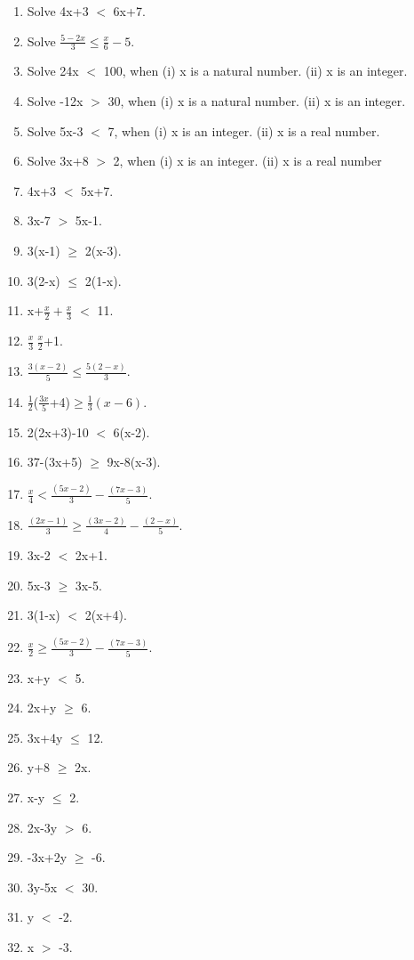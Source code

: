 \begin{enumerate}[label=\arabic*.,ref=\thesubsection.\theenumi]
    \item Solve 4x+3 $<$ 6x+7.
    \item Solve $\frac{5-2x}{3} \leq \frac{x}{6}-5$.

	\item Solve 24x $<$ 100, when
	(i) x is a natural number.
	(ii) x is an integer.
	\item Solve -12x $>$ 30, when
	(i) x is a natural number.
	(ii) x is an integer.
	\item Solve 5x-3 $<$ 7, when
	(i) x is an integer.
	(ii) x is a real number.
	\item Solve 3x+8 $>$ 2, when
	(i) x is an integer.
	(ii) x is a real number
	
	\item 4x+3 $<$ 5x+7.
	\item 3x-7 $>$ 5x-1.
	\item 3(x-1) $\geq$ 2(x-3).
	\item 3(2-x) $\leq$ 2(1-x).
	\item x+$\frac{x}{2}+\frac{x}{3}$ $<$ 11.
	\item $\frac{x}{3}\>\frac{x}{2}$+1.
	\item $\frac{3(x-2)}{5}\leq\frac{5(2-x)}{3}$.
	\item $ \frac{1}{2}$($\frac{3x}{5}$+4)$\geq\frac{1}{3}(x-6)$.
	\item 2(2x+3)-10 $<$ 6(x-2).
	\item 37-(3x+5) $\geq$ 9x-8(x-3).
	\item $\frac{x}{4}<\frac{(5x-2)}{3}-\frac{(7x-3)}{5}$.
	\item $\frac{(2x-1)}{3}\geq\frac{(3x-2)}{4}-\frac{(2-x)}{5}$.
	
    \item 3x-2 $<$ 2x+1.
    \item 5x-3 $\geq$ 3x-5.
    \item 3(1-x) $<$ 2(x+4).
    \item $\frac{x}{2}\geq\frac{(5x-2)}{3}-\frac{(7x-3)}{5}$.

    \item x+y $<$ 5.
    \item 2x+y $\geq$ 6.    
    \item 3x+4y $\leq$ 12.
    \item y+8 $\geq$ 2x.
    \item x-y $\leq$ 2.
    \item 2x-3y $>$ 6.
    \item -3x+2y $\geq$ -6.
    \item 3y-5x $<$ 30.
    \item y $<$ -2.
    \item x $>$ -3.
    

\end{enumerate}
